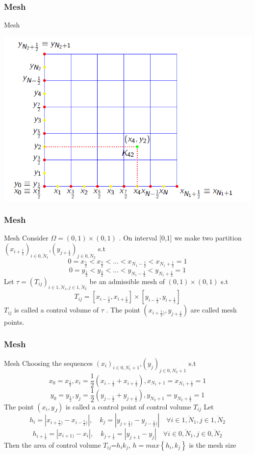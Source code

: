\documentclass[11pt]{beamer}
\numberwithin{equation}{section}
\theoremstyle{plain}
\theoremstyle{definition}
\theoremstyle{remark}
\begin{document}
\begin{frame}\frametitle{Mesh}
\begin{block}{Mesh}
\begin{center}
\includegraphics[scale=0.35]{1}
\end{center}
\end{block}
\end{frame}

\begin{frame}\frametitle{Mesh}
\begin{block}{Mesh}
Consider $\Omega = (0,1) \times (0,1)$ . On interval [0,1] we make two partition $(x_{i+\frac{1}{2}})_{i\in \overline{0,N_1}}$,$(y_{j+\frac{1}{2}})_{j\in \overline{0,N_2}}$ s.t
$$0=x_{\frac{1}{2}}< x_{\frac{3}{2}} < ... < x_{N_1-\frac{1}{2}} < x_{N_1+\frac{1}{2}} =1 $$ 
$$0=y_{\frac{1}{2}}< y_{\frac{3}{2}} < ... < y_{N_1-\frac{1}{2}} < y_{N_1+\frac{1}{2}} =1 $$ 
Let $\tau=(T_{ij})_{i\in \overline{1,N_1},j\in \overline{1,N_2}}$ be an admissible mesh of $(0,1) \times (0,1)$ s.t
$$T_{ij}=[x_{i-\frac{1}{2}},x_{i+\frac{1}{2}}] \times [y_{i-\frac{1}{2}},y_{i+\frac{1}{2}}]$$
$T_{ij}$ is called a control volume of $\tau$ . The point $(x_{i+\frac{1}{2})},y_{j+\frac{1}{2}})$ are called mesh points.
\end{block}
\end{frame}

\begin{frame}\frametitle{Mesh}
\begin{block}{Mesh}
Choosing the sequences $(x_{i})_{i\in \overline{0,N_1+1}}$,$(y_{j})_{j\in \overline{0,N_2+1}}$ s.t
$$x_0=x_{\frac{1}{2}},x_i= \frac{1}{2}(x_{i-\frac{1}{2}}+x_{i+\frac{1}{2}}) , x_{N_1+1} = x_{N_1+\frac{1}{2}} =1 $$ 
$$y_0=y_{\frac{1}{2}},y_j= \frac{1}{2}(y_{j-\frac{1}{2}}+y_{j+\frac{1}{2}}) , y_{N_2+1} = y_{N_2+\frac{1}{2}} =1 $$ 
The point $(x_i,y_J)$ is called a control point of control volume $T_{ij}$ 
Let
$$h_i=|x_{i+\frac{1}{2})}-x_{i-\frac{1}{2})}|, \quad k_j=|y_{j+\frac{1}{2})}-y_{j-\frac{1}{2})}| \quad \forall i\in \overline{1,N_1} ,j\in \overline{1,N_2}$$ 
$$h_{i+\frac{1}{2}}=|x_{i+1)}-x_{i}|, \quad k_{j+\frac{1}{2}}=|y_{j+1}-y_{j}| \quad \forall i\in \overline{0,N_1} ,j\in \overline{0,N_2}$$ 
Then the area of control volume $T_{ij}$=$h_ik_j$, $h=max\left \{ h_i,k_j \right \}$ is the mesh size
\end{block}
\end{frame}
\end{document}
